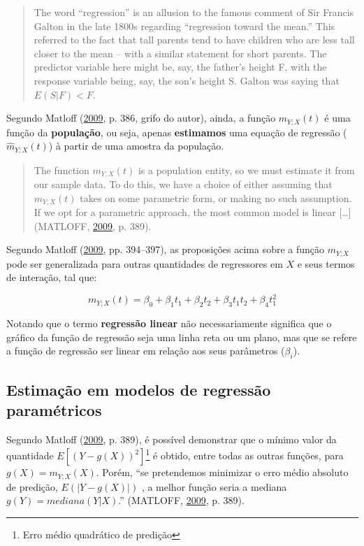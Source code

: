 \documentclass[a4paper]{article}
\let\rmarkdownfootnote\footnote%
\def\footnote{\protect\rmarkdownfootnote}
\begin{document}
\begin{quote}
The word ``regression'' is an allusion to the famous comment of Sir
Francis Galton in the late 1800s regarding ``regression toward the
mean.'' This referred to the fact that tall parents tend to have
children who are less tall closer to the mean -- with a similar
statement for short parents. The predictor variable here might be, say,
the father's height F, with the response variable being, say, the son's
height S. Galton was saying that \(E(S|F) < F\).
\end{quote}

Segundo Matloff (\protect\hyperlink{ref-matloff2009}{2009}, p. 386,
grifo do autor), ainda, a função \(m_{Y;X}(t)\) é uma função da
\textbf{população}, ou seja, apenas \textbf{estimamos} uma equação de
regressão (\(\hat{m}_{Y;X}(t)\)) à partir de uma amostra da população.

\begin{quote}
The function \(m_{Y;X}(t)\) is a population entity, so we must estimate
it from our sample data. To do this, we have a choice of either assuming
that \(m_{Y;X}(t)\) takes on some parametric form, or making no such
assumption. If we opt for a parametric approach, the most common model
is linear {[}\ldots{}{]} (MATLOFF,
\protect\hyperlink{ref-matloff2009}{2009}, p. 389).
\end{quote}

Segundo Matloff (\protect\hyperlink{ref-matloff2009}{2009}, pp.
394--397), as proposições acima sobre a função \(m_{Y;X}\) pode ser
generalizada para outras quantidades de regressores em \(X\) e seus
termos de interação, tal que:

\[m_{Y;X}(t) = \beta_0 + \beta_1t_1 + \beta_2t_2 + \beta_3t_1t_2 + \beta_4t_1^2\]

Notando que o termo \textbf{regressão linear} não necessariamente
significa que o gráfico da função de regressão seja uma linha reta ou um
plano, mas que se refere a função de regressão ser linear em relação aos
seus parâmetros (\(\beta_i\)).

\subsection{Estimação em modelos de regressão
paramétricos}\label{estimacao-em-modelos-de-regressao-parametricos}

Segundo Matloff (\protect\hyperlink{ref-matloff2009}{2009}, p. 389), é
possível demonstrar que o mínimo valor da quantidade
\(E[(Y - g(X))^2]\)\footnote{Erro médio quadrático de predição} é
obtido, entre todas as outras funções, para \(g(X) = m_{Y;X}(X)\).
Porém, ``se pretendemos minimizar o erro médio absoluto de predição,
\(E(|Y - g(X)|)\) , a melhor função seria a mediana
\(g(Y) = mediana(Y|X)\).'' (MATLOFF,
\protect\hyperlink{ref-matloff2009}{2009}, p. 389).
\end{document}
